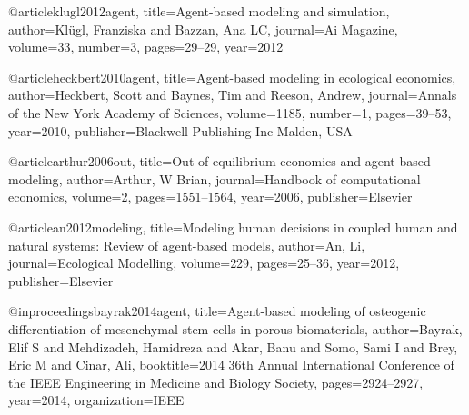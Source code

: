 @article{klugl2012agent,
  title={Agent-based modeling and simulation},
  author={Kl{\"u}gl, Franziska and Bazzan, Ana LC},
  journal={Ai Magazine},
  volume={33},
  number={3},
  pages={29--29},
  year={2012}
}

@article{heckbert2010agent,
  title={Agent-based modeling in ecological economics},
  author={Heckbert, Scott and Baynes, Tim and Reeson, Andrew},
  journal={Annals of the New York Academy of Sciences},
  volume={1185},
  number={1},
  pages={39--53},
  year={2010},
  publisher={Blackwell Publishing Inc Malden, USA}
}

@article{arthur2006out,
  title={Out-of-equilibrium economics and agent-based modeling},
  author={Arthur, W Brian},
  journal={Handbook of computational economics},
  volume={2},
  pages={1551--1564},
  year={2006},
  publisher={Elsevier}
}

@article{an2012modeling,
  title={Modeling human decisions in coupled human and natural systems: Review of agent-based models},
  author={An, Li},
  journal={Ecological Modelling},
  volume={229},
  pages={25--36},
  year={2012},
  publisher={Elsevier}
}

@inproceedings{bayrak2014agent,
  title={Agent-based modeling of osteogenic differentiation of mesenchymal stem cells in porous biomaterials},
  author={Bayrak, Elif S and Mehdizadeh, Hamidreza and Akar, Banu and Somo, Sami I and Brey, Eric M and Cinar, Ali},
  booktitle={2014 36th Annual International Conference of the IEEE Engineering in Medicine and Biology Society},
  pages={2924--2927},
  year={2014},
  organization={IEEE}
}